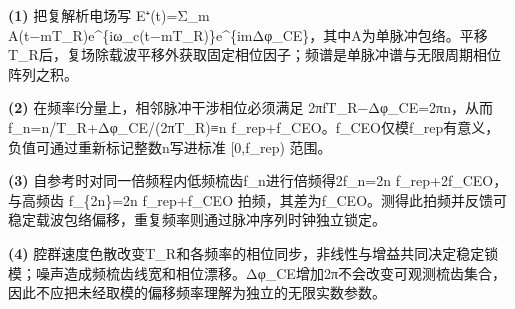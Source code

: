\par\noindent\textbf{(1)} 把复解析电场写 E⁺(t)=Σ\_m A(t−mT\_R)e\textasciicircum{}\{iω\_c(t−mT\_R)\}e\textasciicircum{}\{imΔφ\_CE\}，其中A为单脉冲包络。平移T\_R后，复场除载波平移外获取固定相位因子；频谱是单脉冲谱与无限周期相位阵列之积。
\par\noindent\textbf{(2)} 在频率f分量上，相邻脉冲干涉相位必须满足 2πfT\_R−Δφ\_CE=2πn，从而 f\_n=n/T\_R+Δφ\_CE/(2πT\_R)≡n f\_rep+f\_CEO。f\_CEO仅模f\_rep有意义，负值可通过重新标记整数n写进标准 [0,f\_rep) 范围。
\par\noindent\textbf{(3)} 自参考时对同一倍频程内低频梳齿f\_n进行倍频得2f\_n=2n f\_rep+2f\_CEO，与高频齿 f\_\{2n\}=2n f\_rep+f\_CEO 拍频，其差为f\_CEO。测得此拍频并反馈可稳定载波包络偏移，重复频率则通过脉冲序列时钟独立锁定。
\par\noindent\textbf{(4)} 腔群速度色散改变T\_R和各频率的相位同步，非线性与增益共同决定稳定锁模；噪声造成频梳齿线宽和相位漂移。Δφ\_CE增加2π不会改变可观测梳齿集合，因此不应把未经取模的偏移频率理解为独立的无限实数参数。
